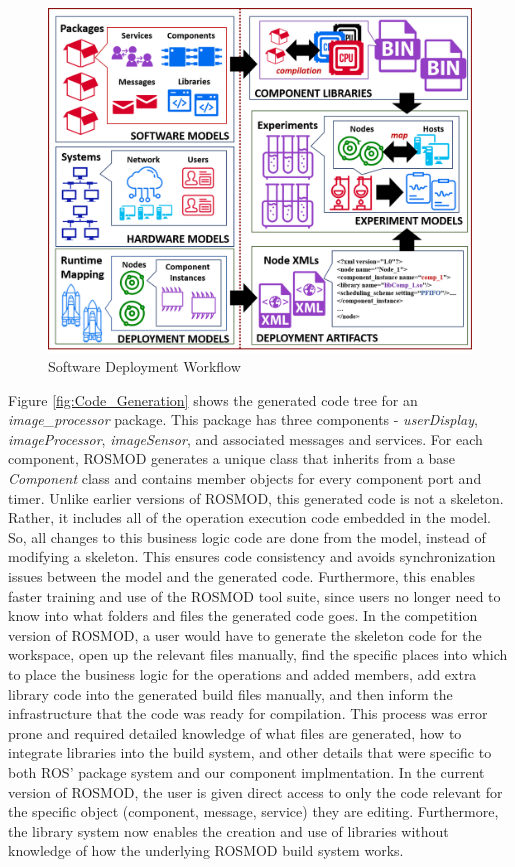 \begin{figure}[h]
	\centering
        \includegraphics[width=\textwidth]{./Figures/DeploymentInfrastructure.png}
	\caption{Software Deployment Workflow}
	\label{fig:workflow}
\end{figure}

Figure \ref{fig:Code_Generation} shows the generated code tree for an
\emph{image\_processor} package. This package has three components -
\emph{userDisplay}, \emph{imageProcessor}, \emph{imageSensor}, and
associated messages and services. For each component, ROSMOD generates
a unique class that inherits from a base \emph{Component} class and
contains member objects for every component port and timer. Unlike
earlier versions of ROSMOD, this generated code is not a
skeleton. Rather, it includes all of the operation execution code
embedded in the model. So, all changes to this business logic code are
done from the model, instead of modifying a skeleton. This ensures
code consistency and avoids synchronization issues between the model
and the generated code.  Furthermore, this enables faster training and
use of the ROSMOD tool suite, since users no longer need to know into
what folders and files the generated code goes.  In the competition
version of ROSMOD, a user would have to generate the skeleton code for
the workspace, open up the relevant files manually, find the specific
places into which to place the business logic for the operations and
added members, add extra library code into the generated build files
manually, and then inform the infrastructure that the code was ready
for compilation.  This process was error prone and required detailed
knowledge of what files are generated, how to integrate libraries into
the build system, and other details that were specific to both ROS'
package system and our component implmentation.  In the current
version of ROSMOD, the user is given direct access to only the code
relevant for the specific object (component, message, service) they
are editing.  Furthermore, the library system now enables the creation
and use of libraries without knowledge of how the underlying ROSMOD
build system works.

